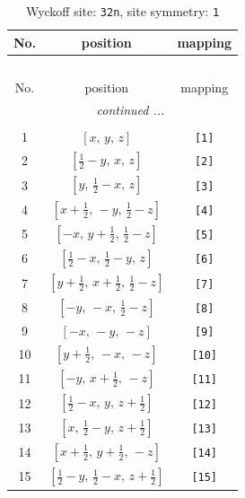\documentclass[fleqn,8pt]{jsarticle}
\begin{document}
\renewcommand{\arraystretch}{1.2}
\begin{longtable}{ccc}
\caption{Wyckoff site: {\tt 32n}, site symmetry: {\tt 1}}
 \\
 \hline \hline
No. & position & mapping \\ \hline \endfirsthead

\multicolumn{2}{l}{\tablename\ \thetable{}} \\
 \hline \hline
No. & position & mapping \\ \hline \endhead

 \hline \hline
\multicolumn{2}{r}{\footnotesize\it continued ...} \\ \endfoot

 \hline \hline
\multicolumn{2}{r}{} \\ \endlastfoot

1 & $\left[ x,\, y,\, z \right]$ & {\tt [1]} \\ \hline
2 & $\left[ \frac{1}{2} - y,\, x,\, z \right]$ & {\tt [2]} \\ \hline
3 & $\left[ y,\, \frac{1}{2} - x,\, z \right]$ & {\tt [3]} \\ \hline
4 & $\left[ x + \frac{1}{2},\, - y,\, \frac{1}{2} - z \right]$ & {\tt [4]} \\ \hline
5 & $\left[ - x,\, y + \frac{1}{2},\, \frac{1}{2} - z \right]$ & {\tt [5]} \\ \hline
6 & $\left[ \frac{1}{2} - x,\, \frac{1}{2} - y,\, z \right]$ & {\tt [6]} \\ \hline
7 & $\left[ y + \frac{1}{2},\, x + \frac{1}{2},\, \frac{1}{2} - z \right]$ & {\tt [7]} \\ \hline
8 & $\left[ - y,\, - x,\, \frac{1}{2} - z \right]$ & {\tt [8]} \\ \hline
9 & $\left[ - x,\, - y,\, - z \right]$ & {\tt [9]} \\ \hline
10 & $\left[ y + \frac{1}{2},\, - x,\, - z \right]$ & {\tt [10]} \\ \hline
11 & $\left[ - y,\, x + \frac{1}{2},\, - z \right]$ & {\tt [11]} \\ \hline
12 & $\left[ \frac{1}{2} - x,\, y,\, z + \frac{1}{2} \right]$ & {\tt [12]} \\ \hline
13 & $\left[ x,\, \frac{1}{2} - y,\, z + \frac{1}{2} \right]$ & {\tt [13]} \\ \hline
14 & $\left[ x + \frac{1}{2},\, y + \frac{1}{2},\, - z \right]$ & {\tt [14]} \\ \hline
15 & $\left[ \frac{1}{2} - y,\, \frac{1}{2} - x,\, z + \frac{1}{2} \right]$ & {\tt [15]} \\ \hline

\end{longtable}
\end{document}
